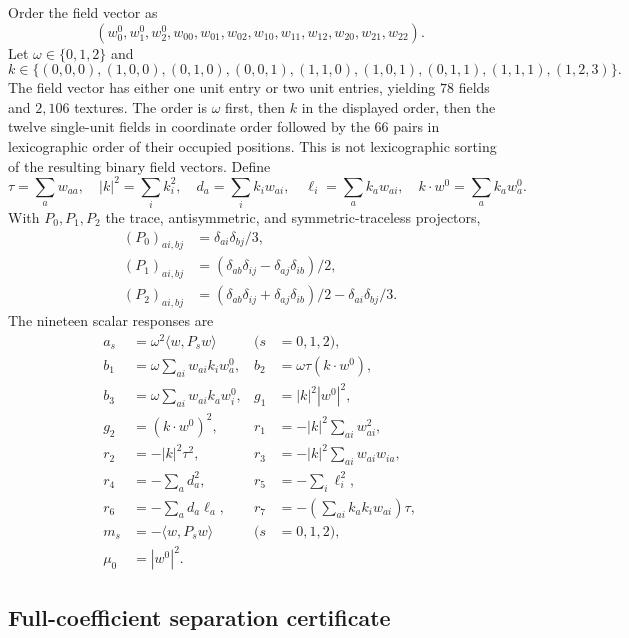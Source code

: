 Order the field vector as
\[
(w^0_0,w^0_1,w^0_2,w_{00},w_{01},w_{02},w_{10},w_{11},w_{12},
 w_{20},w_{21},w_{22}).
\]
Let $\omega\in\{0,1,2\}$ and
\[
k\in\{(0,0,0),(1,0,0),(0,1,0),(0,0,1),(1,1,0),(1,0,1),
(0,1,1),(1,1,1),(1,2,3)\}.
\]
The field vector has either one unit entry or two unit entries, yielding
$78$ fields and $2{,}106$ textures.  The order is $\omega$ first, then $k$
in the displayed order, then the twelve single-unit fields in coordinate
order followed by the $66$ pairs in lexicographic order of their occupied
positions.  This is not lexicographic sorting of the resulting binary
field vectors.  Define
\[
\tau=\sum_a w_{aa},\quad |k|^2=\sum_i k_i^2,\quad
d_a=\sum_i k_iw_{ai},\quad \ell_i=\sum_a k_aw_{ai},\quad
k\mathbin{\cdot}w^0=\sum_a k_aw^0_a.
\]
With $P_0,P_1,P_2$ the trace, antisymmetric, and symmetric-traceless
projectors,
\begin{align*}
(P_0)_{ai,bj}&=\delta_{ai}\delta_{bj}/3,\\
(P_1)_{ai,bj}&=(\delta_{ab}\delta_{ij}-\delta_{aj}\delta_{ib})/2,\\
(P_2)_{ai,bj}&=(\delta_{ab}\delta_{ij}+\delta_{aj}\delta_{ib})/2
                -\delta_{ai}\delta_{bj}/3.
\end{align*}
The nineteen scalar responses are
\begin{align*}
a_s&=\omega^2\langle w,P_sw\rangle &(s&=0,1,2),\\
b_1&=\omega\sum_{ai}w_{ai}k_iw^0_a,
&b_2&=\omega\tau(k\mathbin{\cdot}w^0),\\
b_3&=\omega\sum_{ai}w_{ai}k_aw^0_i,
&g_1&=|k|^2|w^0|^2,\\
g_2&=(k\mathbin{\cdot}w^0)^2,
&r_1&=-|k|^2\sum_{ai}w_{ai}^2,\\
r_2&=-|k|^2\tau^2,
&r_3&=-|k|^2\sum_{ai}w_{ai}w_{ia},\\
r_4&=-\sum_a d_a^2,
&r_5&=-\sum_i\ell_i^2,\\
r_6&=-\sum_a d_a\ell_a,
&r_7&=-\left(\sum_{ai}k_ak_iw_{ai}\right)\tau,\\
m_s&=-\langle w,P_sw\rangle &(s&=0,1,2),\\
\mu_0&=|w^0|^2.&&
\end{align*}

\subsection{Full-coefficient separation certificate}\label{supp:full-separation}

